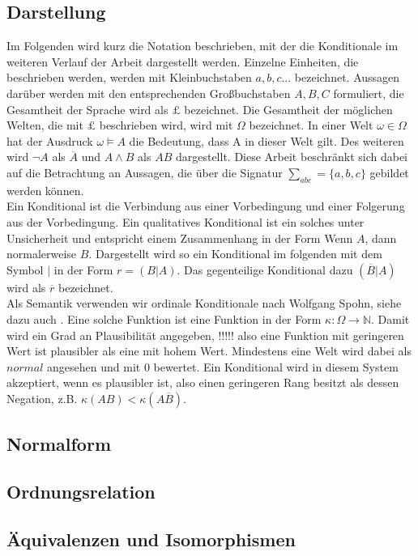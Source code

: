 \documentclass[12pt,a4paper]{article}
\begin{document}
\subsection{Darstellung}
Im Folgenden wird kurz die Notation beschrieben, mit der die Konditionale im weiteren Verlauf der Arbeit dargestellt werden. Einzelne Einheiten, die beschrieben werden, werden mit Kleinbuchstaben $a, b, c ...$ bezeichnet. Aussagen darüber werden mit den entsprechenden Großbuchstaben $A, B, C$ formuliert, die Gesamtheit der Sprache wird als $\pounds$ bezeichnet. Die Gesamtheit der möglichen Welten, die mit $\pounds$ beschrieben wird, wird mit $\Omega$ bezeichnet. In einer Welt $\omega \in \Omega$  hat der Ausdruck $\omega \models A$ die Bedeutung, dass A in dieser Welt gilt. Des weiteren wird $\neg A$ als $\overline{A}$ und $A \wedge B$ als $AB$ dargestellt. Diese Arbeit beschränkt sich dabei auf die Betrachtung an Aussagen, die über die Signatur $\sum_{abc} = \{a, b, c\}$ gebildet werden können. \\
Ein Konditional ist die Verbindung aus einer Vorbedingung und einer Folgerung aus der Vorbedingung. Ein qualitatives Konditional ist ein solches unter  Unsicherheit und entspricht einem Zusammenhang in der Form \glqq Wenn $A$, dann normalerweise $B$\grqq . Dargestellt wird so ein Konditional  im folgenden mit dem Symbol $|$ in der Form $r = (B|A)$. Das gegenteilige Konditional dazu $(\overline{B}|A)$ wird als $\overline{r}$ bezeichnet.\\
Als Semantik verwenden wir ordinale Konditionale nach Wolfgang Spohn, siehe dazu auch \cite{spohn12}. Eine solche Funktion ist eine Funktion in der Form $\kappa :  \Omega \rightarrow \mathbb{N} $. Damit wird ein Grad an Plausibilität angegeben,
 !!!!! 
 also eine Funktion mit geringeren Wert ist plausibler als eine mit hohem Wert. Mindestens eine Welt wird dabei als $normal$ angesehen und mit 0 bewertet. Ein Konditional wird in diesem System akzeptiert, wenn es plausibler ist, also einen geringeren Rang besitzt als dessen Negation, z.B. $\kappa(AB)<\kappa(A\overline{B})$.

\subsection{Normalform}
\subsection{Ordnungsrelation}
\subsection{Äquivalenzen und Isomorphismen}
\end{document}
